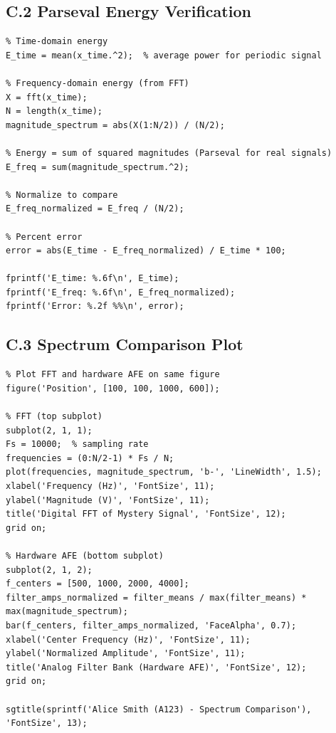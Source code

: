 \documentclass[11pt,letterpaper]{article}
\begin{document}
\subsection*{C.2 Parseval Energy Verification}

\begin{verbatim}
% Time-domain energy
E_time = mean(x_time.^2);  % average power for periodic signal

% Frequency-domain energy (from FFT)
X = fft(x_time);
N = length(x_time);
magnitude_spectrum = abs(X(1:N/2)) / (N/2);

% Energy = sum of squared magnitudes (Parseval for real signals)
E_freq = sum(magnitude_spectrum.^2);

% Normalize to compare
E_freq_normalized = E_freq / (N/2);

% Percent error
error = abs(E_time - E_freq_normalized) / E_time * 100;

fprintf('E_time: %.6f\n', E_time);
fprintf('E_freq: %.6f\n', E_freq_normalized);
fprintf('Error: %.2f %%\n', error);
\end{verbatim}

\subsection*{C.3 Spectrum Comparison Plot}

\begin{verbatim}
% Plot FFT and hardware AFE on same figure
figure('Position', [100, 100, 1000, 600]);

% FFT (top subplot)
subplot(2, 1, 1);
Fs = 10000;  % sampling rate
frequencies = (0:N/2-1) * Fs / N;
plot(frequencies, magnitude_spectrum, 'b-', 'LineWidth', 1.5);
xlabel('Frequency (Hz)', 'FontSize', 11);
ylabel('Magnitude (V)', 'FontSize', 11);
title('Digital FFT of Mystery Signal', 'FontSize', 12);
grid on;

% Hardware AFE (bottom subplot)
subplot(2, 1, 2);
f_centers = [500, 1000, 2000, 4000];
filter_amps_normalized = filter_means / max(filter_means) * max(magnitude_spectrum);
bar(f_centers, filter_amps_normalized, 'FaceAlpha', 0.7);
xlabel('Center Frequency (Hz)', 'FontSize', 11);
ylabel('Normalized Amplitude', 'FontSize', 11);
title('Analog Filter Bank (Hardware AFE)', 'FontSize', 12);
grid on;

sgtitle(sprintf('Alice Smith (A123) - Spectrum Comparison'), 'FontSize', 13);
\end{verbatim}

\clearpage
\end{document}
